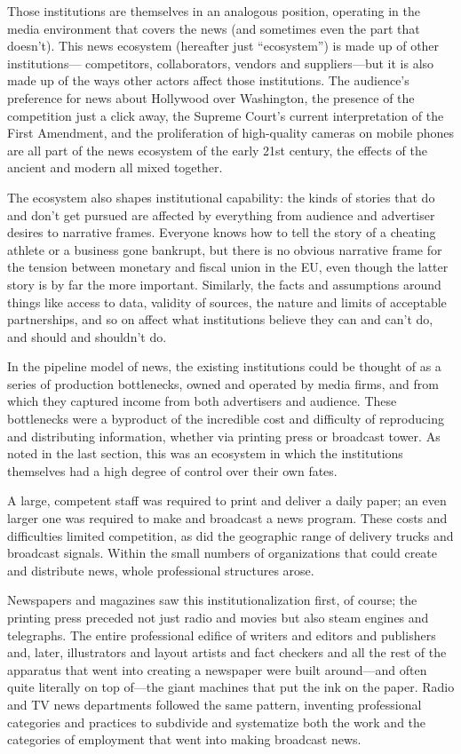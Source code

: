 Those institutions are themselves in an analogous position, operating in the media
environment that covers the news (and sometimes even the part that doesn’t).
This news ecosystem (hereafter just ``ecosystem'') is made up of other institutions—
competitors, collaborators, vendors and suppliers—but it is also made up
of the ways other actors affect those institutions. The audience’s preference for
news about Hollywood over Washington, the presence of the competition just a
click away, the Supreme Court’s current interpretation of the First Amendment,
and the proliferation of high-quality cameras on mobile phones are all part of the
news ecosystem of the early 21st century, the effects of the ancient and modern
all mixed together.

The ecosystem also shapes institutional capability: the kinds of stories that do and
don’t get pursued are affected by everything from audience and advertiser desires
to narrative frames. Everyone knows how to tell the story of a cheating athlete or
a business gone bankrupt, but there is no obvious narrative frame for the tension
between monetary and fiscal union in the EU, even though the latter story is by
far the more important. Similarly, the facts and assumptions around things like
access to data, validity of sources, the nature and limits of acceptable partnerships,
and so on affect what institutions believe they can and can’t do, and should and
shouldn’t do.

In the pipeline model of news, the existing institutions could be thought of as a
series of production bottlenecks, owned and operated by media firms, and from
which they captured income from both advertisers and audience. These bottlenecks
were a byproduct of the incredible cost and difficulty of reproducing and
distributing information, whether via printing press or broadcast tower. As noted
in the last section, this was an ecosystem in which the institutions themselves had
a high degree of control over their own fates.

A large, competent staff was required to print and deliver a daily paper; an even
larger one was required to make and broadcast a news program. These costs and
difficulties limited competition, as did the geographic range of delivery trucks
and broadcast signals. Within the small numbers of organizations that could create
and distribute news, whole professional structures arose.

Newspapers and magazines saw this institutionalization first, of course; the printing
press preceded not just radio and movies but also steam engines and telegraphs.
The entire professional edifice of writers and editors and publishers and,
later, illustrators and layout artists and fact checkers and all the rest of the apparatus
that went into creating a newspaper were built around—and often quite
literally on top of—the giant machines that put the ink on the paper. Radio and
TV news departments followed the same pattern, inventing professional categories
and practices to subdivide and systematize both the work and the categories
of employment that went into making broadcast news.

